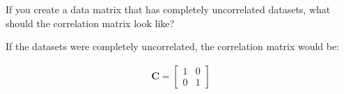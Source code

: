 If you create a data matrix that has completely uncorrelated datasets, what should the correlation matrix look like?

\begin{solution}
    If the datasets were completely uncorrelated, the correlation matrix would be:
    
    \begin{align}
        \boldsymbol{C} = \begin{bmatrix}
            1 & 0 \\
            0 & 1
        \end{bmatrix}
    \end{align}
\end{solution}